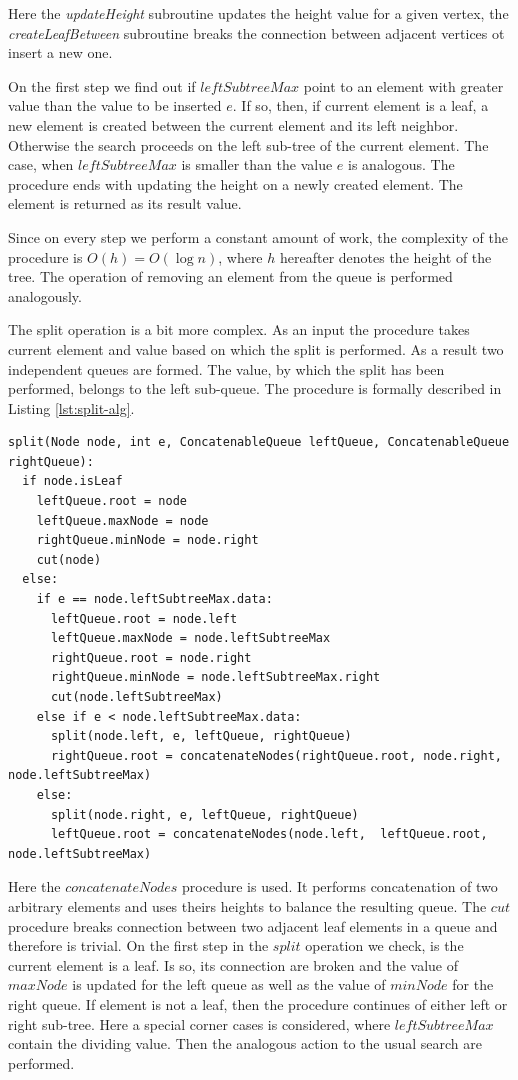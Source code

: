 \documentclass[conference]{IEEEtran}
\begin{document}
	Here the \textit{updateHeight} subroutine updates the height value for a given vertex, the \textit{createLeafBetween} subroutine breaks the connection between adjacent vertices ot insert a new one.
	
	On the first step we find out if $leftSubtreeMax$ point to an element with greater value than the value to be inserted $e$. If so, then, if current element is a leaf, a new element is created between the current element and its left neighbor. Otherwise the search proceeds on the left sub-tree of the current element. The case, when $leftSubtreeMax$ is smaller than the value $e$ is analogous. The procedure ends with updating the height on a newly created element. The element is returned as its result value.
	
	Since on every step we perform a constant amount of work, the complexity of the procedure is $O(h)=O(\log n)$, where $h$ hereafter denotes the height of the tree. The operation of removing an element from the queue is performed analogously. 
	
	The split operation is a bit more complex. As an input the procedure takes current element and value based on which the split is performed. As a result two independent queues are formed. The value, by which the split has been performed, belongs to the left sub-queue. The procedure is formally described in Listing \ref{lst:split-alg}.
	
		\begin{lstlisting}[caption={Queue split algorithm},label={lst:split-alg},captionpos=b]
split(Node node, int e, ConcatenableQueue leftQueue, ConcatenableQueue rightQueue):
  if node.isLeaf
    leftQueue.root = node
    leftQueue.maxNode = node
    rightQueue.minNode = node.right
    cut(node)
  else:
    if e == node.leftSubtreeMax.data:
      leftQueue.root = node.left
      leftQueue.maxNode = node.leftSubtreeMax
      rightQueue.root = node.right
      rightQueue.minNode = node.leftSubtreeMax.right
      cut(node.leftSubtreeMax)
    else if e < node.leftSubtreeMax.data:
      split(node.left, e, leftQueue, rightQueue)
      rightQueue.root = concatenateNodes(rightQueue.root, node.right, node.leftSubtreeMax)
    else:
      split(node.right, e, leftQueue, rightQueue)
      leftQueue.root = concatenateNodes(node.left,  leftQueue.root, node.leftSubtreeMax)
		\end{lstlisting}

	Here the $concatenateNodes$ procedure is used. It performs concatenation of two arbitrary elements and uses theirs heights to balance the resulting queue. The $cut$ procedure breaks connection between two adjacent leaf elements in a queue and therefore is trivial. On the first step in the $split$ operation we check, is the current element is a leaf. Is so, its connection are broken and the value of $maxNode$ is updated for the left queue as well as the value of $minNode$ for the right queue. If element is not a leaf, then the procedure continues of either left or right sub-tree. Here a special corner cases is considered, where $leftSubtreeMax$ contain the dividing value. Then the analogous action to the usual search are performed.
	
\end{document}
